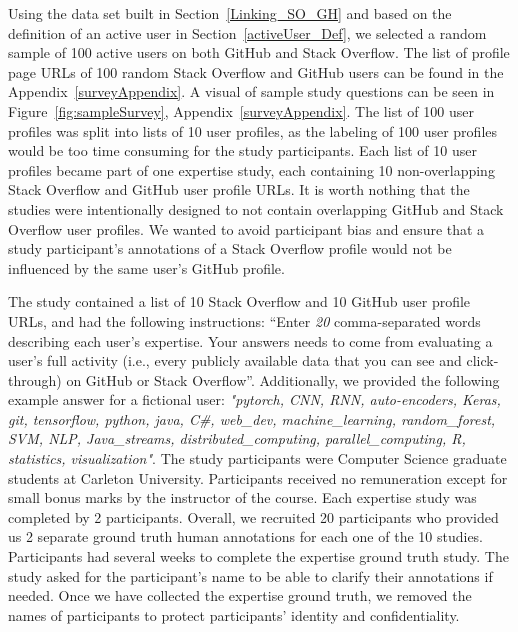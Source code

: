             Using the data set built in Section~\ref{Linking_SO_GH} and based on the definition of an active user in Section~\ref{activeUser_Def}, we selected a random sample of 100 active users on both GitHub and Stack Overflow. The list of profile page URLs of 100 random Stack Overflow and GitHub users can be found in the Appendix~\ref{surveyAppendix}. A visual of sample study questions can be seen in Figure~\ref{fig:sampleSurvey}, Appendix~\ref{surveyAppendix}. The list of 100 user profiles was split into lists of 10 user profiles, as the labeling of 100 user profiles would be too time consuming for the study participants. Each list of 10 user profiles became part of one expertise study, each containing 10 non-overlapping Stack Overflow and GitHub user profile URLs. It is worth nothing that the studies were intentionally designed to not contain overlapping GitHub and Stack Overflow user profiles. We wanted to avoid participant bias and ensure that a study participant's annotations of a Stack Overflow profile would not be influenced by the same user's GitHub profile.
            
            The study contained a list of 10 Stack Overflow and 10 GitHub user profile URLs, and had the following instructions: ``Enter \emph{20} comma-separated words describing each user's expertise. Your answers needs to come from evaluating a user's full activity (i.e., every publicly available data that you can see and click-through) on GitHub or Stack Overflow''. Additionally, we provided the following example answer for a fictional user: \emph{"pytorch, CNN, RNN, auto-encoders, Keras, git, tensorflow, python, java, C\#, web\_dev, machine\_learning, random\_forest, SVM, NLP, Java\_streams, distributed\_computing, parallel\_computing, R, statistics, visualization"}. The study participants were Computer Science graduate students at Carleton University. Participants received no remuneration except for small bonus marks by the instructor of the course.
            Each expertise study was completed by 2 participants. Overall, we recruited 20 participants who provided us 2 separate ground truth human annotations for each one of the 10 studies. Participants had several weeks to complete the expertise ground truth study. The study asked for the participant's name to be able to clarify their annotations if needed. Once we have collected the expertise ground truth, we removed the names of participants to protect participants' identity and confidentiality.  
        
